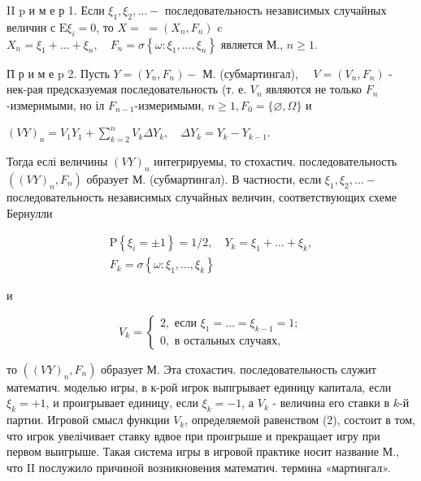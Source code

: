 \documentclass[10pt]{article}
\begin{document}
II p и м е р 1. Если $\xi_{1}, \xi_{2}, \ldots-$ последовательность независимых случайных величин с $\mathrm{E} \xi_{i}=0$, то $X=$ $=\left(X_{n}, F_{n}\right)$ c $X_{n}=\xi_{1}+\ldots+\xi_{n}, \quad F_{n}=\sigma\left\{\omega: \xi_{1}, \ldots, \xi_{n}\right\}$ является М., $n \geqslant 1$.



П р и м е p 2. Пусть $Y=\left(Y_{n}, F_{n}\right)-$ М. (субмартингал), $\quad V=\left(V_{n}, F_{n}\right)$ - нек-рая предсказуемая последовательность (т. е. $V_{n}$ являются не только $F_{n}$-измеримыми, но іл $F_{n-1}$-измеримыми, $n \geqslant 1, F_{0}=\{\varnothing, \Omega\}$ и



$(V Y)_{n}=V_{1} Y_{1}+\sum_{k=2}^{n} V_{k} \Delta Y_{k}, \quad \Delta Y_{k}=Y_{k}-Y_{k-1}$.



Тогда еслі величины $(V Y)_{n}$ интегрируемы, то стохастич. последовательность $\left((V Y)_{n}, F_{n}\right)$ образует М. (субмартингал). В частности, если $\xi_{1}, \xi_{2}, \ldots-$ последовательность независимых случайных величин, соответствующих схеме Бернулли



\[

\begin{gathered}

\mathrm{P}\left\{\xi_{i}= \pm 1\right\}=1 / 2, \quad Y_{k}=\xi_{1}+\ldots+\xi_{k}, \\

F_{k}=\sigma\left\{\omega: \xi_{1}, \ldots, \xi_{k}\right\}

\end{gathered}

\]



и



\[

V_{k}=\left\{\begin{array}{l}

2, \text { если } \xi_{1}=\ldots=\xi_{k-1}=1 ; \\

0, \text { в остальных случаях, }

\end{array}\right.

\]



то $\left((V Y)_{n}, F_{n}\right)$ образует М. Эта стохастич. последовательность служит математич. моделью игры, в к-рой игрок выпгрывает единицу капитала, если $\xi_{k}=+1$, и проигрывает единицу, если $\xi_{k}=-1$, а $V_{k}$ - величина его ставки в $k$-й партии. Игровой смысл функции $V_{k}$, определяемой равенством (2), состоит в том, что игрок увелічивает ставку вдвое при проигрыше и прекращает игру при первом выигрыше. Такая система игры в игровой практике носит название М., что II послужило причиной возникновения математич. термина «мартингал».
\end{document}
